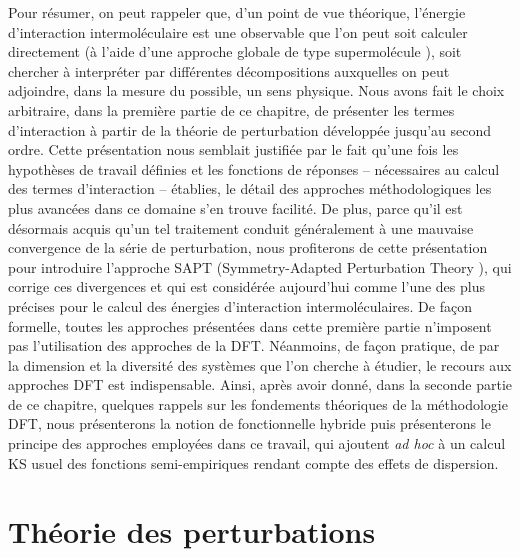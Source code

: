 	
	Pour résumer, on peut rappeler que, d’un point de vue théorique, l’énergie d’interaction intermoléculaire est une observable que l’on peut soit calculer directement (à l’aide d’une approche globale de type \og supermolécule \fg), soit chercher à interpréter par différentes décompositions auxquelles on peut adjoindre, dans la mesure du possible, un sens physique. Nous avons fait le choix arbitraire, dans la première partie de ce chapitre, de présenter les termes d’interaction à partir de la théorie de perturbation développée jusqu’au second ordre. Cette présentation nous semblait justifiée par le fait qu’une fois les hypothèses de travail définies et les fonctions de réponses -- nécessaires au calcul des termes d’interaction -- établies, le détail des approches méthodologiques les plus avancées dans ce domaine s’en trouve facilité. De plus, parce qu’il est désormais acquis qu’un tel traitement conduit généralement à une mauvaise convergence de la série de perturbation, nous profiterons de cette présentation pour introduire l’approche SAPT (\og Symmetry-Adapted Perturbation Theory \fg), qui corrige ces divergences et qui est considérée aujourd’hui comme l’une des plus précises pour le calcul des énergies d’interaction intermoléculaires. 
	De façon formelle, toutes les approches présentées dans cette première partie n’imposent pas l’utilisation des approches de la DFT. Néanmoins, de façon pratique, de par la dimension et la diversité des systèmes que l’on cherche à étudier, le recours aux approches DFT est indispensable. Ainsi, après avoir donné, dans la seconde partie de ce chapitre, quelques rappels sur les fondements théoriques de la méthodologie DFT, nous présenterons la notion de fonctionnelle hybride puis présenterons le principe des approches employées dans ce travail, qui ajoutent \textit{ad hoc} à un calcul KS usuel des fonctions semi-empiriques rendant compte des effets de dispersion.\\
	
	
	
	
	
	
	
	
	
	
	
	
	\section[Théorie des perturbations]{Théorie des perturbations}
	
